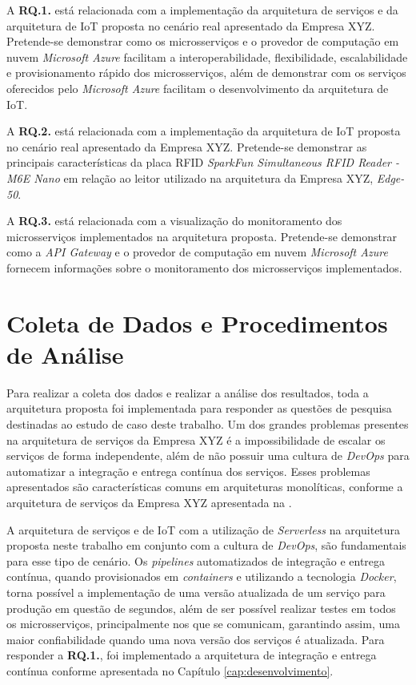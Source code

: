A \textbf{RQ.1.} está relacionada com a implementação da arquitetura de serviços e da arquitetura de \acrshort{IoT} proposta no cenário real apresentado da Empresa XYZ. Pretende-se demonstrar como os microsserviços e o provedor de computação em nuvem \textit{Microsoft Azure} facilitam a interoperabilidade, flexibilidade, escalabilidade e provisionamento rápido dos microsserviços, além de demonstrar com os serviços oferecidos pelo \textit{Microsoft Azure} facilitam o desenvolvimento da arquitetura de \acrshort{IoT}.

A \textbf{RQ.2.} está relacionada com a implementação da arquitetura de \acrlong{IoT} proposta no cenário real apresentado da Empresa XYZ. Pretende-se demonstrar as principais características da placa \acrshort{RFID} \textit{SparkFun Simultaneous RFID Reader - M6E Nano} em relação ao leitor utilizado na arquitetura da Empresa XYZ, \textit{Edge-50}.

A \textbf{RQ.3.} está relacionada com a visualização do monitoramento dos microsserviços implementados na arquitetura proposta. Pretende-se demonstrar como a \textit{API Gateway} e o provedor de computação em nuvem \textit{Microsoft Azure} fornecem informações sobre o monitoramento dos microsserviços implementados.

\section{Coleta de Dados e Procedimentos de Análise}

Para realizar a coleta dos dados e realizar a análise dos resultados, toda a arquitetura proposta foi implementada para responder as questões de pesquisa destinadas ao estudo de caso deste trabalho. Um dos grandes problemas presentes na arquitetura de serviços da Empresa XYZ é a impossibilidade de escalar os serviços de forma independente, além de não possuir uma cultura de \textit{DevOps} para automatizar a integração e entrega contínua dos serviços. Esses problemas apresentados são características comuns em arquiteturas monolíticas, conforme a arquitetura de serviços da Empresa XYZ apresentada na .

A arquitetura de serviços e de \acrshort{IoT} com a utilização de \textit{Serverless} na arquitetura proposta neste trabalho em conjunto com a cultura de \textit{DevOps}, são fundamentais para esse tipo de cenário. Os \textit{pipelines} automatizados de integração e entrega contínua, quando provisionados em \textit{containers} e utilizando a tecnologia \textit{Docker}, torna possível a implementação de uma versão atualizada de um serviço para produção em questão de segundos, além de ser possível realizar testes em todos os microsserviços, principalmente nos que se comunicam, garantindo assim, uma maior confiabilidade quando uma nova versão dos serviços é atualizada. Para responder a \textbf{RQ.1.}, foi implementado a arquitetura de integração e entrega contínua conforme apresentada no Capítulo \ref{cap:desenvolvimento}.

